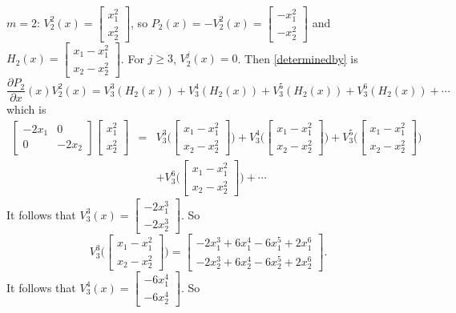 \documentclass{article}
\theoremstyle{definition}
\begin{document}
$m=2$:
$V_2^2(x)=\begin{bmatrix}x_1^2\\x_2^2\end{bmatrix}$, so $P_2(x)=-V_2^2(x)=\begin{bmatrix}
-x_1^2\\-x_2^2\end{bmatrix}$ and $H_2(x)=\begin{bmatrix}x_1-x_1^2\\x_2-x_2^2\end{bmatrix}$.
For $j \geq 3$, $V_2^j(x)=0$. Then \eqref{determinedby} is
\[
\frac{\partial P_2}{\partial x}(x)V_2^2(x)=V_3^3(H_2(x))+V_3^4(H_2(x))+V_3^5(H_2(x))+
V_3^6(H_2(x))+\cdots
\]
which is
\begin{eqnarray*}
\begin{bmatrix}-2x_1&0\\0&-2x_2\end{bmatrix}\begin{bmatrix}x_1^2\\x_2^2\end{bmatrix}
&=&V_3^3\Big( \begin{bmatrix}x_1-x_1^2\\x_2-x_2^2\end{bmatrix}\Big)
+V_3^4\Big( \begin{bmatrix}x_1-x_1^2\\x_2-x_2^2\end{bmatrix}\Big)
+V_3^5\Big( \begin{bmatrix}x_1-x_1^2\\x_2-x_2^2\end{bmatrix}\Big)\\
&&
+V_3^6\Big( \begin{bmatrix}x_1-x_1^2\\x_2-x_2^2\end{bmatrix}\Big)
+\cdots
\end{eqnarray*}
It follows that $V_3^3(x)=\begin{bmatrix}-2x_1^3\\-2x_2^3\end{bmatrix}$. So
\[
V_3^3\Big( \begin{bmatrix}x_1-x_1^2\\x_2-x_2^2\end{bmatrix}\Big)
=\begin{bmatrix}-2x_1^3+6x_1^4-6x_1^5+2x_1^6\\-2x_2^3+6x_2^4-6x_2^5+2x_2^6\end{bmatrix}.
\]
It follows that $V_3^4(x)=\begin{bmatrix}-6x_1^4\\-6x_2^4\end{bmatrix}$. So
\end{document}
